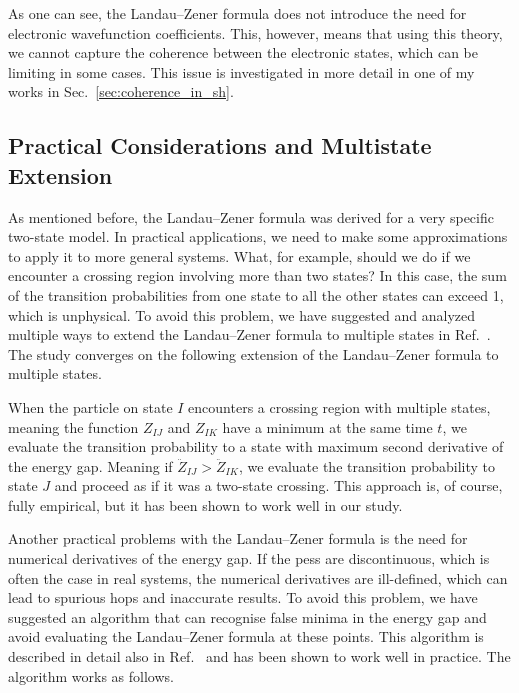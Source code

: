 As one can see, the Landau--Zener formula does not introduce the need for electronic wavefunction coefficients. This, however, means that using this theory, we cannot capture the coherence between the electronic states, which can be limiting in some cases. This issue is investigated in more detail in one of my works in Sec.~\ref{sec:coherence_in_sh}.
\subsection{Practical Considerations and Multistate Extension}\label{sec:landau_zener_practical_considerations}
As mentioned before, the Landau--Zener formula was derived for a very specific two-state model. In practical applications, we need to make some approximations to apply it to more general systems. What, for example, should we do if we encounter a crossing region involving more than two states? In this case, the sum of the transition probabilities from one state to all the other states can exceed 1, which is unphysical. To avoid this problem, we have suggested and analyzed multiple ways to extend the Landau--Zener formula to multiple states in Ref.~\cite{10.1021/acs.jctc.5c01176}. The study converges on the following extension of the Landau--Zener formula to multiple states.

When the particle on state $I$ encounters a crossing region with multiple states, meaning the function $Z_{IJ}$ and $Z_{IK}$ have a minimum at the same time $t$, we evaluate the transition probability to a state with maximum second derivative of the energy gap. Meaning if $\ddot Z_{IJ}>\ddot Z_{IK}$, we evaluate the transition probability to state $J$ and proceed as if it was a two-state crossing. This approach is, of course, fully empirical, but it has been shown to work well in our study.

Another practical problems with the Landau--Zener formula is the need for numerical derivatives of the energy gap. If the \glspl{pes} are discontinuous, which is often the case in real systems, the numerical derivatives are ill-defined, which can lead to spurious hops and inaccurate results. To avoid this problem, we have suggested an algorithm that can recognise false minima in the energy gap and avoid evaluating the Landau--Zener formula at these points. This algorithm is described in detail also in Ref.~\cite{10.1021/acs.jctc.5c01176} and has been shown to work well in practice. The algorithm works as follows.

